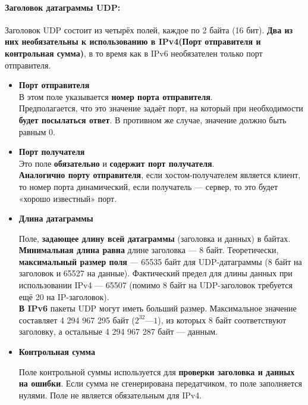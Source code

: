 \paragraph{Заголовок датаграммы \textbf{UDP}:\\}
Заголовок UDP состоит из четырёх полей, каждое по 2 байта (16 бит). \textbf{Два из них необязательны к использованию в IPv4(Порт отправителя и контрольная сумма)}, в то время как в IPv6 необязателен только порт отправителя.
\begin{itemize}
    \item \textbf{Порт отправителя}\\
В этом поле указывается \textbf{номер порта отправителя}.\\


Предполагается, что это значение задаёт порт, на который при необходимости \textbf{будет посылаться ответ}. В противном же случае, значение должно быть равным 0.

    \item \textbf{Порт получателя}\\
Это поле \textbf{обязательно} и \textbf{содержит порт получателя}.\\


\textbf{Аналогично порту отправителя}, если хостом-получателем является клиент, то номер порта динамический, если получатель — сервер, то это будет «хорошо известный» порт.

\item \textbf{Длина датаграммы}

Поле, \textbf{задающее длину всей датаграммы} (заголовка и данных) в байтах. \textbf{Минимальная длина равна} длине заголовка — 8 байт. Теоретически, \textbf{максимальный размер поля} — 65535 байт для UDP-датаграммы (8 байт на заголовок и 65527 на данные). Фактический предел для длины данных при использовании IPv4 — 65507 (помимо 8 байт на UDP-заголовок требуется ещё 20 на IP-заголовок).\\

\textbf{В  IPv6} пакеты UDP могут иметь больший размер. Максимальное значение составляет 4 294 967 295 байт ($2^{32} — 1$), из которых 8 байт соответствуют заголовку, а остальные 4 294 967 287 байт — данным.

\item \textbf{Контрольная сумма}

Поле контрольной суммы используется для \textbf{проверки заголовка и данных на ошибки}. Если сумма не сгенерирована передатчиком, то поле заполняется нулями. Поле не является обязательным для IPv4.

\end{itemize}

